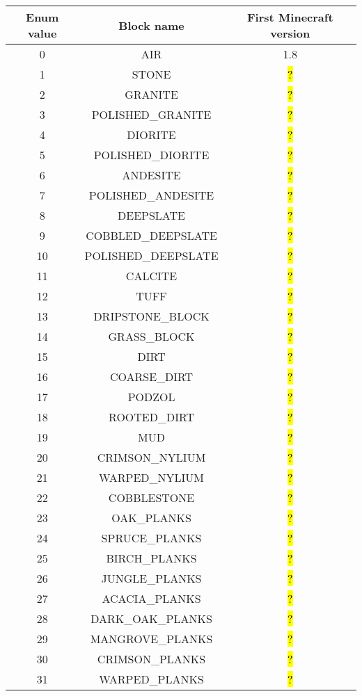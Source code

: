 \documentclass[11pt]{article}
\newcommand\myworries[1]{\sethlcolor{red}\hl{#1}}
\begin{document}
\begin{longtable}{ |c|c|c| }
	\hline
	Enum value & Block name & First Minecraft version \\
	\hline
	\endhead
	0 & AIR & 1.8 \\
	1 & STONE & \myworries{?} \\
	2 & GRANITE & \myworries{?} \\
	3 & POLISHED\_GRANITE & \myworries{?} \\
	4 & DIORITE & \myworries{?} \\
	5 & POLISHED\_DIORITE & \myworries{?} \\
	6 & ANDESITE & \myworries{?} \\
	7 & POLISHED\_ANDESITE & \myworries{?} \\
	8 & DEEPSLATE & \myworries{?} \\
	9 & COBBLED\_DEEPSLATE & \myworries{?} \\
	10 & POLISHED\_DEEPSLATE & \myworries{?} \\
	11 & CALCITE & \myworries{?} \\
	12 & TUFF & \myworries{?} \\
	13 & DRIPSTONE\_BLOCK & \myworries{?} \\
	14 & GRASS\_BLOCK & \myworries{?} \\
	15 & DIRT & \myworries{?} \\
	16 & COARSE\_DIRT & \myworries{?} \\
	17 & PODZOL & \myworries{?} \\
	18 & ROOTED\_DIRT & \myworries{?} \\
	19 & MUD & \myworries{?} \\
	20 & CRIMSON\_NYLIUM & \myworries{?} \\
	21 & WARPED\_NYLIUM & \myworries{?} \\
	22 & COBBLESTONE & \myworries{?} \\
	23 & OAK\_PLANKS & \myworries{?} \\
	24 & SPRUCE\_PLANKS & \myworries{?} \\
	25 & BIRCH\_PLANKS & \myworries{?} \\
	26 & JUNGLE\_PLANKS & \myworries{?} \\
	27 & ACACIA\_PLANKS & \myworries{?} \\
	28 & DARK\_OAK\_PLANKS & \myworries{?} \\
	29 & MANGROVE\_PLANKS & \myworries{?} \\
	30 & CRIMSON\_PLANKS & \myworries{?} \\
	31 & WARPED\_PLANKS & \myworries{?} \\

\end{longtable}
\end{document}
